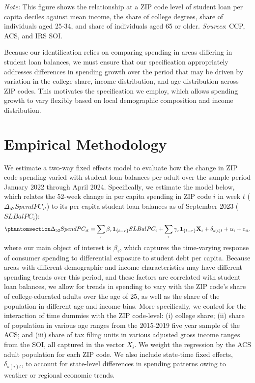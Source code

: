\documentclass[
  letterpaper,
  DIV=11,
  numbers=noendperiod]{scrartcl}
\begin{document}
\emph{Note:} This figure shows the relationship at a ZIP code level of
student loan per capita deciles against mean income, the share of
college degrees, share of individuals aged 25-34, and share of
individuals aged 65 or older. \emph{Sources}: CCP, ACS, and IRS SOI.

Because our identification relies on comparing spending in areas
differing in student loan balances, we must ensure that our
specification appropriately addresses differences in spending growth
over the period that may be driven by variation in the college share,
income distribution, and age distribution across ZIP codes. This
motivates the specification we employ, which allows spending growth to
vary flexibly based on local demographic composition and income
distribution.

\section{Empirical Methodology}\label{empirical-methodology}

We estimate a two-way fixed effects model to evaluate how the change in
ZIP code spending varied with student loan balances per adult over the
sample period January 2022 through April 2024. Specifically, we estimate
the model below, which relates the 52-week change in per capita spending
in ZIP code \(i\) in week \(t\) (\(\Delta_{52} SpendPC_{it}\)) to its
per capita student loan balances as of September 2023 (\(SLBalPC_{i}\)):
\begin{equation}\phantomsection\label{eq-event-study}{
\Delta_{52} SpendPC_{it} 
= \sum_{\tau} \beta_{\tau} \mathbf{1}_{\left\{ t = \tau \right\}}SLBalPC_{i}
+ \sum_{\tau} \gamma _\tau \mathbf{1}_{\left\{ t = \tau \right\}} \mathbf{X}_i 
+ \delta_{s(i)t} + \alpha_{i} + \varepsilon_{it}.
}\end{equation} where our main object of interest is \(\beta_\tau\),
which captures the time-varying response of consumer spending to
differential exposure to student debt per capita. Because areas with
different demographic and income characteristics may have different
spending trends over this period, and these factors are correlated with
student loan balances, we allow for trends in spending to vary with the
ZIP code's share of college-educated adults over the age of 25, as well
as the share of the population in different age and income bins. More
specifically, we control for the interaction of time dummies with the
ZIP code-level: (i) college share; (ii) share of population in various
age ranges from the 2015-2019 five year sample of the ACS; and (iii)
share of tax filing units in various adjusted gross income ranges from
the SOI, all captured in the vector \(X_i\). We weight the regression by
the ACS adult population for each ZIP code. We also include state-time
fixed effects, \(\delta_{s(i)t}\), to account for state-level
differences in spending patterns owing to weather or regional economic
trends.
\end{document}
